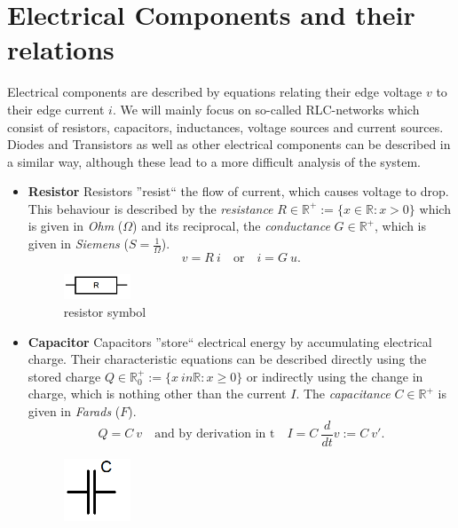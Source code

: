 \section{Electrical Components and their relations}
Electrical components are described by equations relating their edge voltage $v$ to their edge current $i$. We will mainly focus on so-called RLC-networks which consist of resistors, capacitors, inductances, voltage sources and current sources. Diodes and Transistors as well as other electrical components can be described in a similar way, although these lead to a more difficult analysis of the system.
\begin{itemize}
	\item \textbf{Resistor} \newline
	Resistors ''resist`` the flow of current, which causes voltage to drop. This behaviour is described by the \emph{resistance} $R \in \mathbb{R}^+ := \{x \in \mathbb{R}: x > 0\}$ which is given in \emph{Ohm} ($\Omega$) and its reciprocal, the \emph{conductance} $G \in \mathbb{R}^+$, which is given in \emph{Siemens} ($S=\frac{1}{\Omega}$). 
	\begin{displaymath}
		v = R \ i \quad \text{or} \quad i = G \ u.
	\end{displaymath}
	\begin{figure}[H]
		\label{fig:resistor symbol}
		\centering
		\includegraphics[width=2cm]{pictures/resistor.png}
		\caption{resistor symbol}
	\end{figure}
	\item \textbf{Capacitor} \newline
	Capacitors ''store`` electrical energy by accumulating electrical charge. Their characteristic equations can be described directly using the stored charge $Q \in \mathbb{R}^+_0 := \{x \ in \mathbb{R}: x \geq 0\}$ or indirectly using the change in charge, which is nothing other than the current $I$. The \emph{capacitance} $C \in \mathbb{R}^+$ is given in \emph{Farads} ($F$).
	\begin{displaymath}
		Q = C \ v \quad \text{and by derivation in t} \quad I = C \ \frac{d}{dt}v := C \ v'.
	\end{displaymath}
	\begin{figure}[H]
		\label{fig:capacitor symbol}
		\centering
		\includegraphics[width=2cm]{pictures/capacitor.png}

\end{figure}
\end{itemize}
